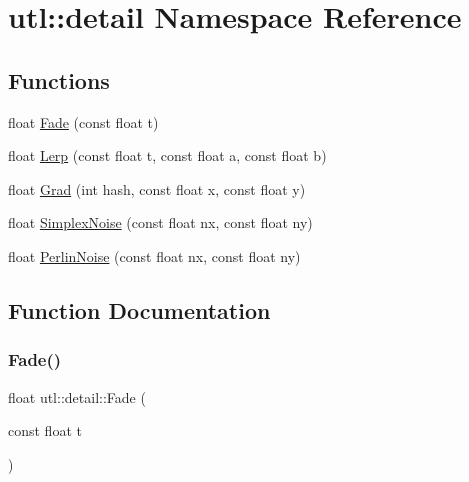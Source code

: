 \hypertarget{namespaceutl_1_1detail}{}\section{utl\+:\+:detail Namespace Reference}
\label{namespaceutl_1_1detail}
\subsection*{Functions}
\begin{DoxyCompactItemize}
\item 
float \mbox{\hyperlink{namespaceutl_1_1detail_a23abf9e3bae65d7a2edb67db38afdaa7}{Fade}} (const float t)
\item 
float \mbox{\hyperlink{namespaceutl_1_1detail_ad7f99771df23814598ee1144880c7ad2}{Lerp}} (const float t, const float a, const float b)
\item 
float \mbox{\hyperlink{namespaceutl_1_1detail_a1bc965831bbe701ce9c978c7b9f101e5}{Grad}} (int hash, const float x, const float y)
\item 
float \mbox{\hyperlink{namespaceutl_1_1detail_aadeaa2155f84401999131d8752628c8a}{Simplex\+Noise}} (const float nx, const float ny)
\item 
float \mbox{\hyperlink{namespaceutl_1_1detail_a95055be80fb1f302966bd9cc6b275e86}{Perlin\+Noise}} (const float nx, const float ny)
\end{DoxyCompactItemize}


\subsection{Function Documentation}
\mbox{\label{namespaceutl_1_1detail_a23abf9e3bae65d7a2edb67db38afdaa7}} 
\subsubsection{\texorpdfstring{Fade()}{Fade()}}
{\footnotesize\ttfamily float utl\+::detail\+::\+Fade (\begin{DoxyParamCaption}\item[{const float}]{t }\end{DoxyParamCaption})}

\mbox{\label{namespaceutl_1_1detail_a1bc965831bbe701ce9c978c7b9f101e5}} 
